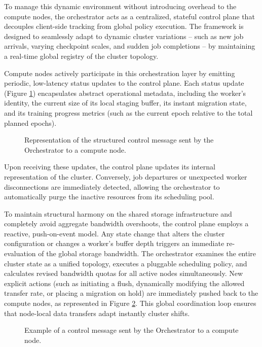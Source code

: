 \documentclass[sigplan,twocolumn,10pt,nonacm]{acmart}
\begin{document}
To manage this dynamic environment without introducing overhead to the compute nodes, the orchestrator acts as a centralized, stateful control plane that
decouples client-side tracking from global policy execution. The framework is designed to seamlessly adapt to dynamic cluster variations -- such as new job arrivals,
varying checkpoint scales, and sudden job completions -- by maintaining a real-time global registry of the cluster topology.

Compute nodes actively participate in this orchestration layer by emitting periodic, low-latency status updates to the control plane. Each status update (Figure \ref{fig:message}) encapsulates
abstract operational metadata, including the worker's identity, the current size of its local staging buffer, its instant migration state, and its training progress
metrics (such as the current epoch relative to the total planned epochs).

\begin{figure}[htbp]
    \centering
    \resizebox{\columnwidth}{!}{%
    }
    \caption{Representation of the structured control message sent by the Orchestrator to a compute node.}
    \label{fig:message}
\end{figure}

Upon receiving these updates, the control plane updates its internal representation of the cluster. Conversely, job departures or unexpected worker disconnections are
immediately detected, allowing the orchestrator to automatically purge the inactive resources from its scheduling pool.

To maintain structural harmony on the shared storage infrastructure and completely avoid aggregate bandwidth overshoots, the control plane employs a reactive,
push-on-event model. Any state change that alters the cluster configuration or changes a worker's buffer depth triggers an immediate re-evaluation of the global
storage bandwidth. The orchestrator examines the entire cluster state as a unified topology, executes a pluggable scheduling policy, and calculates revised bandwidth
quotas for all active nodes simultaneously. New explicit actions (such as initiating a flush, dynamically modifying the allowed transfer rate, or placing a migration
on hold) are immediately pushed back to the compute nodes, as represented in Figure \ref{fig:response}. This global coordination loop ensures that node-local data transfers adapt instantly cluster shifts.

\begin{figure}[htbp]
    \centering
    \resizebox{\columnwidth}{!}{%
    }
    \caption{Example of a control message sent by the Orchestrator to a compute node.}
    \label{fig:response}
\end{figure}
\end{document}
